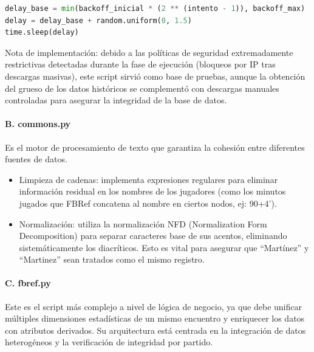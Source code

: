 \begin{lstlisting}[language=Python,caption={Reintento con espera aleatoria para mitigación de detección de bots}]
delay_base = min(backoff_inicial * (2 ** (intento - 1)), backoff_max)
delay = delay_base + random.uniform(0, 1.5)
time.sleep(delay)
\end{lstlisting}
 
Nota de implementación: debido a las políticas de seguridad extremadamente restrictivas detectadas durante la fase de ejecución (bloqueos por IP tras descargas masivas),
este script sirvió como base de pruebas, aunque la obtención del grueso de los datos históricos se complementó con descargas manuales controladas para asegurar la integridad
de la base de datos.
 
\paragraph{B. commons.py}
 
Es el motor de procesamiento de texto que garantiza la cohesión entre diferentes fuentes de datos.
 
\begin{itemize}
\item Limpieza de cadenas: implementa expresiones regulares para eliminar información residual en los nombres de los jugadores (como los minutos jugados que FBRef concatena al nombre en ciertos nodos, ej: 90+4').
 
\item Normalización: utiliza la normalización NFD (Normalization Form Decomposition) para separar caracteres base de sus acentos, eliminando sistemáticamente los diacríticos. Esto es vital para asegurar que ``Martínez'' y ``Martinez'' sean tratados como el mismo registro.
\end{itemize}
 
\paragraph{C. fbref.py}
 
Este es el script más complejo a nivel de lógica de negocio, ya que debe unificar múltiples dimensiones estadísticas de un mismo encuentro y enriquecer
los datos con atributos derivados. Su arquitectura está centrada en la integración de datos heterogéneos y la verificación de integridad por partido.
 
